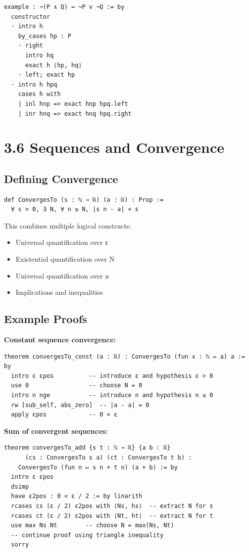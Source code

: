 \documentclass{amsart}
\theoremstyle{plain}
\theoremstyle{definition}
\theoremstyle{remark}
\begin{document}
\begin{lstlisting}[language=lean]
example : ¬(P ∧ Q) ↔ ¬P ∨ ¬Q := by
  constructor
  · intro h
    by_cases hp : P
    · right
      intro hq
      exact h ⟨hp, hq⟩
    · left; exact hp
  · intro h hpq
    cases h with
    | inl hnp => exact hnp hpq.left
    | inr hnq => exact hnq hpq.right
\end{lstlisting}
\section{3.6 Sequences and Convergence}

\subsection{Defining Convergence}

\begin{lstlisting}[language=lean]
def ConvergesTo (s : ℕ → ℝ) (a : ℝ) : Prop :=
  ∀ ε > 0, ∃ N, ∀ n ≥ N, |s n - a| < ε
\end{lstlisting}
This combines multiple logical constructs:

\begin{itemize}
	\item Universal quantification over ε
	\item Existential quantification over N
	\item Universal quantification over n
	\item Implications and inequalities
\end{itemize}

\subsection{Example Proofs}

\textbf{Constant sequence convergence:}

\begin{lstlisting}[language=lean]
theorem convergesTo_const (a : ℝ) : ConvergesTo (fun x : ℕ ↦ a) a := by
  intro ε εpos          -- introduce ε and hypothesis ε > 0
  use 0                 -- choose N = 0
  intro n nge           -- introduce n and hypothesis n ≥ 0
  rw [sub_self, abs_zero]  -- |a - a| = 0
  apply εpos            -- 0 < ε
\end{lstlisting}
\textbf{Sum of convergent sequences:}

\begin{lstlisting}[language=lean]
theorem convergesTo_add {s t : ℕ → ℝ} {a b : ℝ}
      (cs : ConvergesTo s a) (ct : ConvergesTo t b) :
    ConvergesTo (fun n ↦ s n + t n) (a + b) := by
  intro ε εpos
  dsimp
  have ε2pos : 0 < ε / 2 := by linarith
  rcases cs (ε / 2) ε2pos with ⟨Ns, hs⟩  -- extract N for s
  rcases ct (ε / 2) ε2pos with ⟨Nt, ht⟩  -- extract N for t
  use max Ns Nt        -- choose N = max(Ns, Nt)
  -- continue proof using triangle inequality
  sorry
\end{lstlisting}
\end{document}

